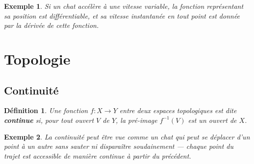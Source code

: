 \documentclass{report}
\newtheorem{definition}{Définition}
\newtheorem{example}{Exemple}
\begin{document}
\begin{example}
Si un chat accélère à une vitesse variable, la fonction représentant sa position est différentiable, et sa vitesse instantanée en tout point est donnée par la dérivée de cette fonction.
\end{example}

\section{Topologie}
\subsection{Continuité}
\begin{definition}
Une fonction \(f : X \to Y\) entre deux espaces topologiques est dite \textbf{continue} si, pour tout ouvert \(V\) de \(Y\), la pré-image \(f^{-1}(V)\) est un ouvert de \(X\).
\end{definition}

\begin{example}
La continuité peut être vue comme un chat qui peut se déplacer d'un point à un autre sans sauter ni disparaître soudainement — chaque point du trajet est accessible de manière continue à partir du précédent.
\end{example}





\end{document}
